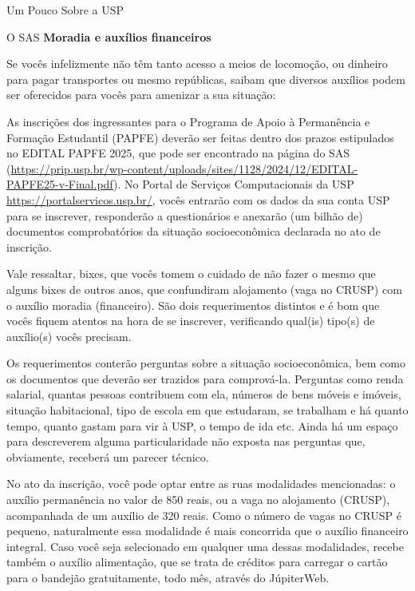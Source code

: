 \begin{secao}{Um Pouco Sobre a USP}
\begin{subsecao}{O SAS}
\textbf{Moradia e auxílios financeiros}

Se vocês infelizmente não têm tanto acesso a meios de locomoção, ou dinheiro para
pagar transportes ou mesmo repúblicas, saibam que diversos auxílios podem ser
oferecidos para vocês para amenizar a sua situação:



As inscrições dos ingressantes para o Programa de Apoio à Permanência e Formação Estudantil (PAPFE)
deverão ser feitas dentro dos prazos estipulados no EDITAL PAPFE 2025, que pode 
ser encontrado na página do SAS (\url{https://prip.usp.br/wp-content/uploads/sites/1128/2024/12/EDITAL-PAPFE25-v-Final.pdf}).
No Portal de Serviços Computacionais da USP \url{https://portalservicos.usp.br/}, vocês entrarão 
com os dados da sua conta USP para se inscrever, responderão a questionários e anexarão (um bilhão de) 
documentos comprobatórios da situação socioeconômica declarada no ato de inscrição.

Vale ressaltar, bixes, que vocês tomem o cuidado de não fazer o mesmo que alguns
bixes de outros anos, que confundiram alojamento (vaga no CRUSP) com o auxílio moradia (financeiro). São dois
requerimentos distintos e é bom que vocês fiquem atentos na hora de se inscrever, verificando
qual(is) tipo(s) de auxílio(s) vocês precisam.

Os requerimentos conterão perguntas sobre a situação socioeconômica, bem como os
documentos que deverão ser trazidos para comprová-la. Perguntas como renda
salarial, quantas pessoas contribuem com ela, números de bens móveis e imóveis,
situação habitacional, tipo de escola em que estudaram, se trabalham e há quanto
tempo, quanto gastam para vir à USP, o tempo de ida etc. Ainda há um espaço
para descreverem alguma particularidade não exposta nas perguntas que, obviamente,
receberá um parecer técnico.

No ato da inscrição, você pode optar entre as ruas modalidades mencionadas: o auxílio permanência
no valor de 850 reais, ou a vaga no alojamento (CRUSP), acompanhada de um auxílio de 320 reais. Como 
o número de vagas no CRUSP é pequeno, naturalmente essa modalidade é mais concorrida que o auxílio financeiro integral.
Caso você seja selecionado em qualquer uma dessas modalidades, recebe também o auxílio alimentação, que se trata de créditos
para carregar o cartão para o bandejão gratuitamente, todo mês, através do JúpiterWeb.


\end{subsecao}
\end{secao}
